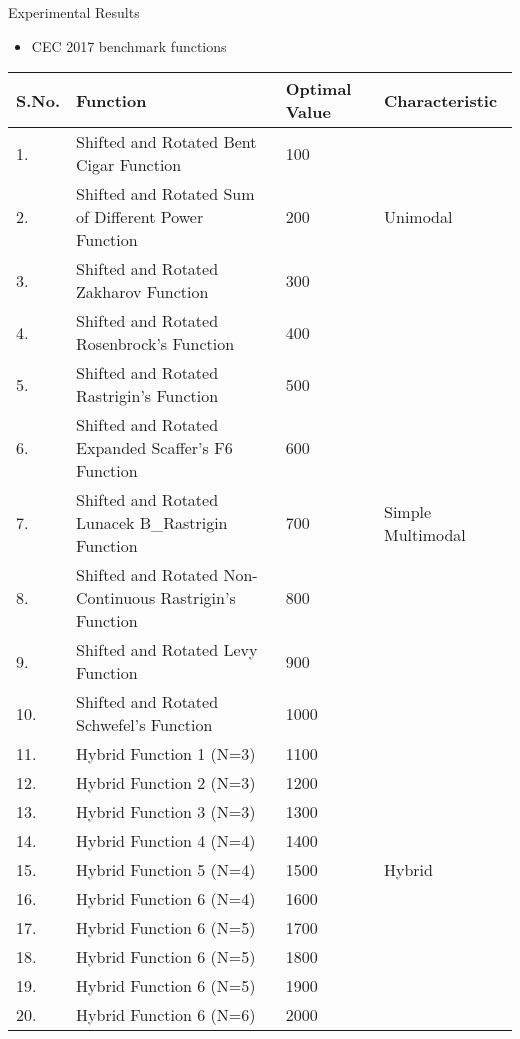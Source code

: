 \documentclass [9pt,times] {beamer}
\begin{document}
\begin{frame}{Experimental Results}
  \begin{itemize}
\fontsize{7pt}{9pt}\selectfont
\item CEC 2017 benchmark functions
\end{itemize}             
    \tiny
\renewcommand{\arraystretch}{1}
\begin{center}
 \begin{tabular}{p{0.2in}   p{2.5in}   p{0.4in} p{0.7in}}
    \hline
\textbf{S.No.}& \textbf{Function}  &  \textbf{Optimal Value } &\textbf{Characteristic}\\
\hline
1. & Shifted and Rotated Bent Cigar Function & 100 &   \\
2. & Shifted and Rotated Sum of Different Power Function & 200 &Unimodal \\
3. & Shifted and Rotated Zakharov Function & 300 &  \\ 
\hline
4. & Shifted and Rotated Rosenbrock’s Function & 400 &\\ 
5. & Shifted and Rotated Rastrigin’s Function & 500 & \\ 
6. & Shifted and Rotated Expanded Scaffer’s F6 Function & 600 & \\ 
7. & Shifted and Rotated Lunacek B\_Rastrigin Function & 700 &  Simple Multimodal \\ 
8.& Shifted and Rotated Non-Continuous Rastrigin’s
Function & 800 & \\  
9.& Shifted and Rotated Levy Function & 900 & \\
10. & Shifted and Rotated Schwefel’s Function & 1000 &   \\
\hline
11. & Hybrid Function 1 (N=3) & 1100 &  \\
12. & Hybrid Function 2 (N=3) & 1200 & \\
13. & Hybrid Function 3 (N=3) & 1300 &  \\
14. & Hybrid Function 4 (N=4) & 1400 & \\
15. & Hybrid Function 5 (N=4) & 1500 &  Hybrid\\
16. & Hybrid Function 6 (N=4) & 1600 & \\
17. & Hybrid Function 6 (N=5) & 1700 & \\
18. & Hybrid Function 6 (N=5) & 1800 & \\
19. & Hybrid Function 6 (N=5) & 1900 & \\
20. & Hybrid Function 6 (N=6) & 2000 &  \\

\end{tabular}
\end{center}
\end{frame}
\end{document}
